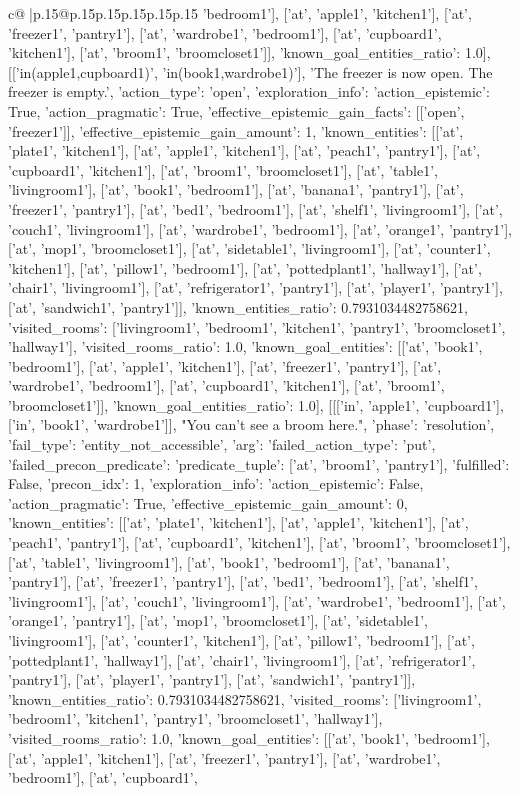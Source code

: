 \documentclass{article}
\begin{document}
{\begin{supertabular}{c@{$\;$}|p{.15\linewidth}@{}p{.15\linewidth}p{.15\linewidth}p{.15\linewidth}p{.15\linewidth}p{.15\linewidth}}
{{{'bedroom1'], ['at', 'apple1', 'kitchen1'], ['at', 'freezer1', 'pantry1'], ['at', 'wardrobe1', 'bedroom1'], ['at', 'cupboard1', 'kitchen1'], ['at', 'broom1', 'broomcloset1']], 'known_goal_entities_ratio': 1.0}}], [['in(apple1,cupboard1)', 'in(book1,wardrobe1)'], 'The freezer is now open. The freezer is empty.', {'action_type': 'open', 'exploration_info': {'action_epistemic': True, 'action_pragmatic': True, 'effective_epistemic_gain_facts': [['open', 'freezer1']], 'effective_epistemic_gain_amount': 1, 'known_entities': [['at', 'plate1', 'kitchen1'], ['at', 'apple1', 'kitchen1'], ['at', 'peach1', 'pantry1'], ['at', 'cupboard1', 'kitchen1'], ['at', 'broom1', 'broomcloset1'], ['at', 'table1', 'livingroom1'], ['at', 'book1', 'bedroom1'], ['at', 'banana1', 'pantry1'], ['at', 'freezer1', 'pantry1'], ['at', 'bed1', 'bedroom1'], ['at', 'shelf1', 'livingroom1'], ['at', 'couch1', 'livingroom1'], ['at', 'wardrobe1', 'bedroom1'], ['at', 'orange1', 'pantry1'], ['at', 'mop1', 'broomcloset1'], ['at', 'sidetable1', 'livingroom1'], ['at', 'counter1', 'kitchen1'], ['at', 'pillow1', 'bedroom1'], ['at', 'pottedplant1', 'hallway1'], ['at', 'chair1', 'livingroom1'], ['at', 'refrigerator1', 'pantry1'], ['at', 'player1', 'pantry1'], ['at', 'sandwich1', 'pantry1']], 'known_entities_ratio': 0.7931034482758621, 'visited_rooms': ['livingroom1', 'bedroom1', 'kitchen1', 'pantry1', 'broomcloset1', 'hallway1'], 'visited_rooms_ratio': 1.0, 'known_goal_entities': [['at', 'book1', 'bedroom1'], ['at', 'apple1', 'kitchen1'], ['at', 'freezer1', 'pantry1'], ['at', 'wardrobe1', 'bedroom1'], ['at', 'cupboard1', 'kitchen1'], ['at', 'broom1', 'broomcloset1']], 'known_goal_entities_ratio': 1.0}}], [[['in', 'apple1', 'cupboard1'], ['in', 'book1', 'wardrobe1']], "You can't see a broom here.", {'phase': 'resolution', 'fail_type': 'entity_not_accessible', 'arg': {'failed_action_type': 'put', 'failed_precon_predicate': {'predicate_tuple': ['at', 'broom1', 'pantry1'], 'fulfilled': False, 'precon_idx': 1}}, 'exploration_info': {'action_epistemic': False, 'action_pragmatic': True, 'effective_epistemic_gain_amount': 0, 'known_entities': [['at', 'plate1', 'kitchen1'], ['at', 'apple1', 'kitchen1'], ['at', 'peach1', 'pantry1'], ['at', 'cupboard1', 'kitchen1'], ['at', 'broom1', 'broomcloset1'], ['at', 'table1', 'livingroom1'], ['at', 'book1', 'bedroom1'], ['at', 'banana1', 'pantry1'], ['at', 'freezer1', 'pantry1'], ['at', 'bed1', 'bedroom1'], ['at', 'shelf1', 'livingroom1'], ['at', 'couch1', 'livingroom1'], ['at', 'wardrobe1', 'bedroom1'], ['at', 'orange1', 'pantry1'], ['at', 'mop1', 'broomcloset1'], ['at', 'sidetable1', 'livingroom1'], ['at', 'counter1', 'kitchen1'], ['at', 'pillow1', 'bedroom1'], ['at', 'pottedplant1', 'hallway1'], ['at', 'chair1', 'livingroom1'], ['at', 'refrigerator1', 'pantry1'], ['at', 'player1', 'pantry1'], ['at', 'sandwich1', 'pantry1']], 'known_entities_ratio': 0.7931034482758621, 'visited_rooms': ['livingroom1', 'bedroom1', 'kitchen1', 'pantry1', 'broomcloset1', 'hallway1'], 'visited_rooms_ratio': 1.0, 'known_goal_entities': [['at', 'book1', 'bedroom1'], ['at', 'apple1', 'kitchen1'], ['at', 'freezer1', 'pantry1'], ['at', 'wardrobe1', 'bedroom1'], ['at', 'cupboard1', }}}
\end{supertabular}}
\end{document}
